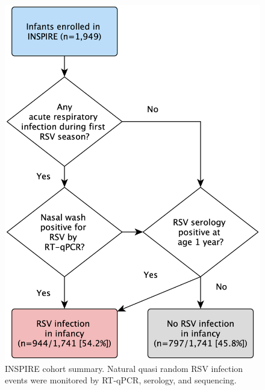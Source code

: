 \documentclass{article}
\begin{document}
\begin{figure}[ht] \hspace*{0cm}  \begin{center}
    \includegraphics[scale=0.1]{f1_rsv_persist2022}
	\caption{INSPIRE cohort summary. Natural quasi random RSV infection events were monitored by RT-qPCR, serology, and sequencing.}
	\label{fig:1}
 \end{center} \end{figure}
 
\end{document}

